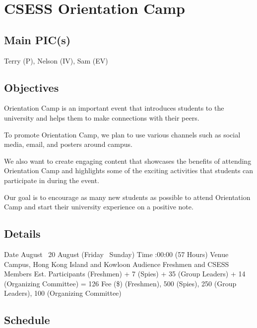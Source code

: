 \section{CSESS Orientation Camp}

\subsection{Main PIC(s)}
Terry (P), Nelson (IV), Sam (EV)

\subsection{Objectives}
\startitemize
\item Orientation Camp is an important event that introduces students to the university and helps them to make connections with their peers.
\item To promote Orientation Camp, we plan to use various channels such as social media, email, and posters around campus.
\item We also want to create engaging content that showcases the benefits of attending Orientation Camp and highlights some of the exciting activities that students can participate in during the event.
\item Our goal is to encourage as many new students as possible to attend Orientation Camp and start their university experience on a positive note.
\stopitemize

\subsection{Details}
\starttabulate[|rB|l|]
\NC Date
 August \endash\ 20 August (Friday \endash\ Sunday) \NR
\NC Time
:00:00 (57 Hours)\NR
\NC Venue
\NC Campus, Hong Kong Island and Kowloon \NR
\NC Audience
\NC Freshmen and CSESS Members \NR
\NC Est. Participants
 (Freshmen) + 7 (Spies) + 35 (Group Leaders) + 14 (Organizing Committee) = 126 \NR
\NC Fee (\$)
 (Freshmen), 500 (Spies), 250 (Group Leaders), 100 (Organizing Committee) \NR
\stoptabulate

\subsection{Schedule}

\setupTABLE[c][1][width=0.75in]
\setupTABLE[c][2][width=1in]
\setupTABLE[c][3][width=3in]
\setupTABLE[c][4][width=1.25in]
\bTABLE
\bTABLEhead

